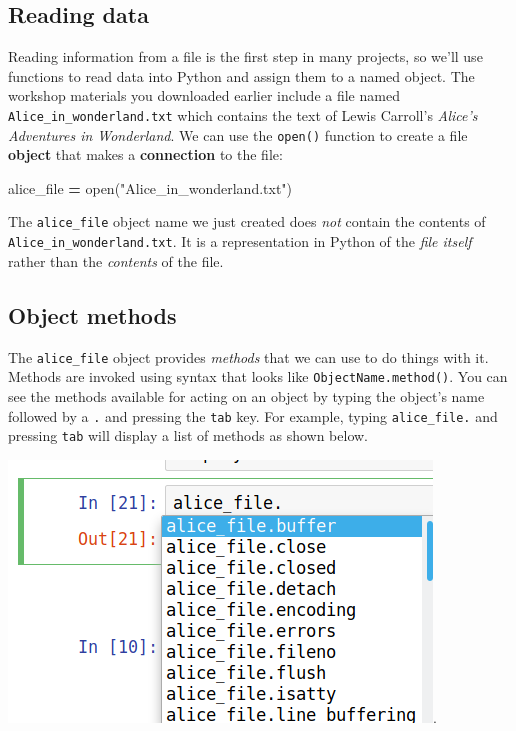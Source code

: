 \documentclass[
]{book}
\newenvironment{Shaded}{\begin{snugshade}}{\end{snugshade}}
\newcommand{\BuiltInTok}[1]{#1}
\newcommand{\NormalTok}[1]{#1}
\newcommand{\OperatorTok}[1]{\textcolor[rgb]{0.81,0.36,0.00}{\textbf{#1}}}
\newcommand{\StringTok}[1]{\textcolor[rgb]{0.31,0.60,0.02}{#1}}
\begin{document}
\hypertarget{reading-data-1}{%
\subsection{Reading data}\label{reading-data-1}}

Reading information from a file is the first step in many projects, so we'll use functions to read data into Python and assign them to a named object. The workshop materials you downloaded earlier include a file named \texttt{Alice\_in\_wonderland.txt} which contains the text of Lewis Carroll's \emph{Alice's Adventures in Wonderland}. We can use the \texttt{open()} function to create a file \textbf{object} that makes a \textbf{connection} to the file:

\begin{Shaded}
\begin{Highlighting}[]
\NormalTok{alice\_file }\OperatorTok{=} \BuiltInTok{open}\NormalTok{(}\StringTok{"Alice\_in\_wonderland.txt"}\NormalTok{)}
\end{Highlighting}
\end{Shaded}

The \texttt{alice\_file} object name we just created does \emph{not} contain the contents of \texttt{Alice\_in\_wonderland.txt}. It is a representation in Python of the \emph{file itself} rather than the \emph{contents} of the file.

\hypertarget{object-methods}{%
\subsection{Object methods}\label{object-methods}}

The \texttt{alice\_file} object provides \emph{methods} that we can use to do things with it. Methods are invoked using syntax that looks like \texttt{ObjectName.method()}. You can see the methods available for acting on an object by typing the object's name followed by a \texttt{.} and pressing the \texttt{tab} key. For example, typing \texttt{alice\_file.} and pressing \texttt{tab} will display a list of methods as shown below.

\includegraphics{Python/PythonIntro/images/notebook_file_completion.png}.
\end{document}
